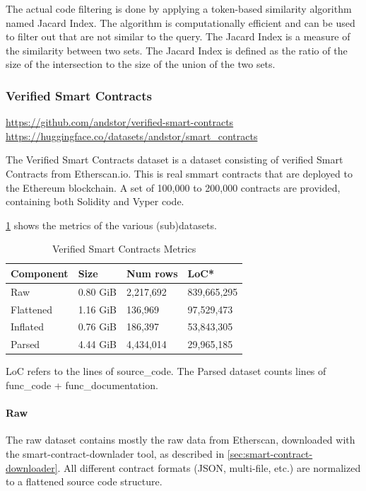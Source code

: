 The actual code filtering is done by applying a token-based similarity algorithm named Jacard Index. The algorithm is computationally efficient and can be used to filter out  that are not similar to the query. The Jacard Index is a measure of the similarity between two sets. The Jacard Index is defined as the ratio of the size of the intersection to the size of the union of the two sets.

\subsubsection{Verified Smart Contracts}
\label{sec:verified-smart-contracts}
\url{https://github.com/andstor/verified-smart-contracts}
\url{https://huggingface.co/datasets/andstor/smart_contracts}

The Verified Smart Contracts dataset is a dataset consisting of verified Smart Contracts from Etherscan.io. This is real smmart contracts that are deployed to the Ethereum blockchain. A set of 100,000 to 200,000 contracts are provided, containing both Solidity and Vyper code.

\cref{tab:verified-smart-contracts-metrics} shows the metrics of the various (sub)datasets.

\begin{table}
    \def\arraystretch{1.5}
    \small
    \centering
    \caption{Verified Smart Contracts Metrics}
    \label{tab:verified-smart-contracts-metrics}
    \begin{tabularx}{\textwidth}{XXXX}
        \toprule
        \textbf{Component} & \textbf{Size} &  \textbf{Num rows} & \textbf{LoC*}\\
        \midrule
        Raw & 0.80 GiB & 2,217,692 & 839,665,295\\
        Flattened & 1.16 GiB & 136,969 & 97,529,473\\
        Inflated & 0.76 GiB & 186,397 & 53,843,305\\
        Parsed & 4.44 GiB & 4,434,014 & 29,965,185\\
        \bottomrule
    \end{tabularx}
\end{table}
LoC refers to the lines of source\_code. The Parsed dataset counts lines of func\_code + func\_documentation.

\paragraph{Raw}
\label{sec:verified-smart-contracts-raw}
The raw dataset contains mostly the raw data from Etherscan, downloaded with the smart-contract-downlader tool, as described in \cref{sec:smart-contract-downloader}. All different contract formats (JSON, multi-file, etc.) are normalized to a flattened source code structure. 

